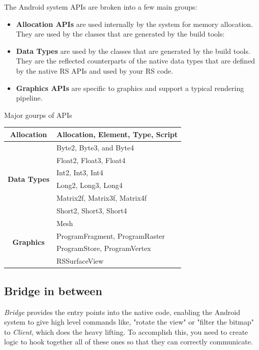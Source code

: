 The Android system APIs are broken into a few main groups\cite{package-summary}:
\begin{itemize}
\item \textbf{Allocation APIs} are used internally by the system for memory allocation. They are used by the classes that are generated by the build tools:
\item \textbf{Data Types} are used by the classes that are generated by the build tools. They are the reflected counterparts of the native data types that are defined by the native RS APIs and used by your RS code. 
\item \textbf{Graphics APIs} are specific to graphics \RS{} and support a typical rendering pipeline.
\end{itemize}
\begin{center-table}
	\label{t:prefix-table}
	\caption{Major gourps of APIs}
	\renewcommand{\arraystretch}{1.0}
	\begin{tabularx}{300pt}{|c|X| }
		\hline
		\multirow{1}{*}{\textbf{Allocation}} &
		Allocation, Element, Type, Script 
		\\ \hline\hline
		\multirow{6}{*}{\textbf{Data Types}} &
        Byte2, Byte3, and Byte4\\ &
        Float2, Float3, Float4\\ &
        Int2, Int3, Int4\\ &
        Long2, Long3, Long4\\ &
        Matrix2f, Matrix3f, Matrix4f\\ &
        Short2, Short3, Short4
        \\ \hline\hline
		\multirow{4}{*}{\textbf{Graphics}} &
		Mesh\\&
		ProgramFragment, ProgramRaster\\&
		ProgramStore, ProgramVertex\\&
		RSSurfaceView
		\\ \hline
	\end{tabularx}
\end{center-table}

\subsection{Bridge in between}
\label{ss:Bridge}
\textit{Bridge} provides the entry points into the native code, enabling the Android system to give high level commands like, "rotate the view" or "filter the bitmap" to \textit{Client}, which does the heavy lifting. To accomplish this, you need to create logic to hook together all of these ones so that they can correctly communicate.

